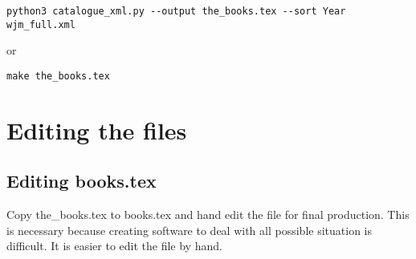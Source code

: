 \documentclass{article}
\begin{document}
\begin{verbatim}
python3 catalogue_xml.py --output the_books.tex --sort Year wjm_full.xml
\end{verbatim}
or
\begin{verbatim}
make the_books.tex
\end{verbatim}

\section{Editing the files}
\subsection{Editing books.tex}
Copy the\_books.tex to books.tex and hand edit the file for final
production. This is necessary because creating software to deal with
all possible situation is difficult.  It is easier to edit the file by
hand.
\end{document}
